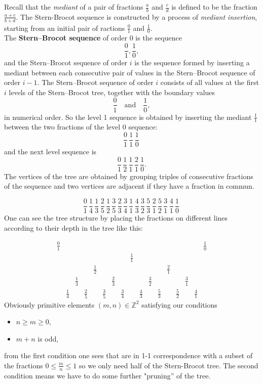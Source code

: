 \documentclass[12pt,a4paper]{amsart}
\def\ZZ{\mathbb{Z}}
\begin{document}
Recall that  the \textit{mediant} of a pair of fractions
$\frac{a}{b}$ and $\frac{c}{d}$ is defined to be the
fraction$\frac{a+c}{b+d}$.
The Stern-Brocot sequence is constructed by a process of \textit{mediant
insertion}, starting from an initial pair of ractions
$\frac{0}{1}$ and $\frac{1}{0}$.
\[
\]
 The \textbf{Stern–Brocot sequence} of order 0 is the sequence 
\[
 \frac{0}{1}, \frac{1}{0} ,
\]
and the Stern–Brocot sequence of order \( i \) is the sequence formed by inserting a mediant between each consecutive pair of values in the Stern–Brocot sequence of order \( i - 1 \). The Stern–Brocot sequence of order \( i \) consists of all values at the first \( i \) levels of the Stern–Brocot tree, together with the boundary values 
\[
\frac{0}{1} \quad \text{and} \quad \frac{1}{0},
\]
in numerical order.
So the level 1 sequence is obtained by inserting the mediant
$\frac{1}{1}$ between the two fractions of the level 0 sequence:
$$\frac{0}{1}\, \frac{1}{1}\, \frac{1}{0}\,$$
and the next level sequence is
$$\frac{0}{1}\, \frac{1}{2}\, \frac{1}{1}\, \frac{2}{1}\,
\frac{1}{0}.$$
The vertices of the tree are  obtained by grouping triples of
consecutive fractions of the sequence and two vertices are adjacent if they have a fraction in commun.

$$\frac{0}{1}\, \frac{1}{4}\, \frac{1}{3}\, \frac{2}{5}\,
\frac{1}{2}\, \frac{3}{5}\, \frac{2}{3}\, \frac{3}{4}\,
\frac{1}{1}\, \frac{4}{3}\, \frac{3}{2}\, \frac{5}{3}\,
\frac{2}{1}\, \frac{5}{2}\, \frac{3}{1}\, \frac{4}{1}\,
\frac{1}{0}\,$$
One can see the tree structure by placing the fractions on different
lines according to their depth in the tree like this:

$$
\begin{array}{ccccccccccccccccc}
\frac{0}{1}& & & & & & & & & & & & & & & &\frac{1}{0}\\
 & & & & & & & &\frac{1}{1}& & & & & & & & \\
 & & & &\frac{1}{2}& & & & & & & &\frac{2}{1}& & & & \\
 & &\frac{1}{3}& & & &\frac{2}{3}& & & &\frac{3}{2}& & & &\frac{3}{1}& & \\
 &\frac{1}{4}& &\frac{2}{5}& &\frac{3}{5}& &\frac{3}{4}& &\frac{4}{3}& &\frac{5}{3}& &\frac{5}{2}& &\frac{4}{1}& 
\end{array}$$
Obviously primitive elements
$(m,n)\in \ZZ^2$ satisfying our conditions
\begin{itemize}
	\item $n \geq m \geq 0$,
	\item $m+n$ is odd,
\end{itemize}
from the first condition one sees that are in 1-1 correspondence with a subset of the fractions 
$0\leq \frac{m}{n}\leq 1$
so we only need half of the Stern-Brocot tree.
The second condition means we have to do some further "pruning'' of
the tree.
\end{document}
